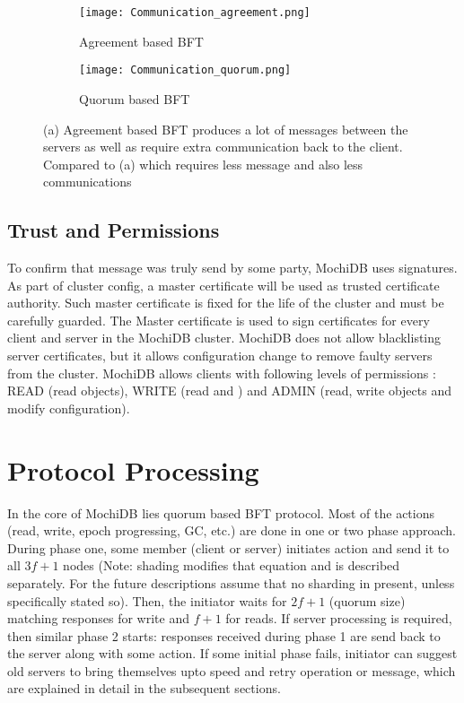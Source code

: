 \documentclass[letterpaper,twocolumn,10pt]{article}
\begin{document}
\begin{figure}
\centering
\begin{subfigure}[b]{0.45\textwidth}
   \texttt{[image: Communication\_agreement.png]}
   \caption{Agreement based BFT}
   \label{fig:Ng1} 
\end{subfigure}

\begin{subfigure}[b]{0.45\textwidth}
   \texttt{[image: Communication\_quorum.png]}
   \caption{Quorum based BFT}
   \label{fig:Ng2}
\end{subfigure}

\caption[Two numerical solutions]{(a) Agreement based BFT produces a lot of messages between the servers as well as require extra communication back to the client. Compared to (a) which requires less message and also less communications}
\end{figure}

\subsection{Trust and Permissions}

To confirm that message was truly send by some party, MochiDB uses signatures. As part of cluster config, a master certificate will be used as trusted certificate authority. Such master certificate is fixed for the life of the cluster and must be carefully guarded. The Master certificate is used to sign certificates for every client and server in the MochiDB cluster. MochiDB does not allow blacklisting server certificates, but it allows configuration change to remove faulty servers from the cluster. MochiDB allows clients with following levels of permissions : READ (read objects), WRITE (read and ) and ADMIN (read, write objects and modify configuration).

\section{Protocol Processing}
In the core of MochiDB lies quorum based BFT protocol. Most of the actions (read, write, epoch progressing, GC, etc.) are done in one or two phase approach. During phase one, some member (client or server) initiates action and send it to all $3f+1$ nodes (Note: shading modifies that equation and is described separately. For the future descriptions assume that no sharding in present, unless specifically stated so). Then, the initiator waits for $2f+1$ (quorum size) matching responses for write and $f+1$ for reads. If server processing is required, then similar phase 2 starts: responses received during phase 1 are send back to the server along with some action. If some initial phase fails, initiator can suggest old servers to bring themselves upto speed and retry operation or message, which are explained in detail in the subsequent sections.
\end{document}
